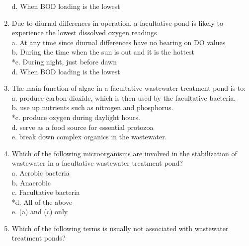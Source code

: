 \begin{enumerate}
d. When BOD loading is the lowest \\


\item  Due to diurnal differences in operation, a facultative pond is likely to experience the lowest dissolved oxygen readings \\


a. At any time since diurnal differences have no bearing on DO values \\

b. During the time when the sun is out and it is the hottest \\

*c. During night, just before dawn \\

d. When BOD loading is the lowest \\


\item  The main function of algae in a facultative wastewater treatment pond is to: \\


a. produce carbon dioxide, which is then used by the facultative bacteria. \\

b. use up nutrients such as nitrogen and phosphorus. \\

*c. produce oxygen during daylight hours. \\

d. serve as a food source for essential protozoa \\

e. break down complex organics in the wastewater. \\


\item  Which of the following microorganisms are involved in the stabilization of wastewater in a facultative wastewater treatment pond? \\


a. Aerobic bacteria \\

b. Anaerobic \\

c. Facultative bacteria \\

*d. All of the above \\

e. (a) and (c) only \\


\item  Which of the following terms is usually not associated with wastewater treatment ponds? \\



\end{enumerate}
